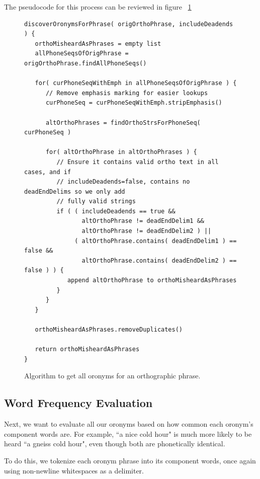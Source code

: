 The pseudocode for this process can be reviewed in figure ~\ref{fig:psuedoCode:discoverOronymsForPhrase}
\setlength\LTleft{-2in}
\begin{figure}
\begin{verbatim}
discoverOronymsForPhrase( origOrthoPhrase, includeDeadends ) {
   orthoMisheardAsPhrases = empty list
   allPhoneSeqsOfOrigPhrase = origOrthoPhrase.findAllPhoneSeqs()
   
   for( curPhoneSeqWithEmph in allPhoneSeqsOfOrigPhrase ) {
      // Remove emphasis marking for easier lookups
      curPhoneSeq = curPhoneSeqWithEmph.stripEmphasis()

      altOrthoPhrases = findOrthoStrsForPhoneSeq( curPhoneSeq )
      
      for( altOrthoPhrase in altOrthoPhrases ) {
         // Ensure it contains valid ortho text in all cases, and if
         // includeDeadends=false, contains no deadEndDelims so we only add
         // fully valid strings
         if ( ( includeDeadends == true &&
                altOrthoPhrase != deadEndDelim1 &&
                altOrthoPhrase != deadEndDelim2 ) ||
              ( altOrthoPhrase.contains( deadEndDelim1 ) == false &&
                altOrthoPhrase.contains( deadEndDelim2 ) == false ) ) {
            append altOrthoPhrase to orthoMisheardAsPhrases
         }
      }
   }
   
   orthoMisheardAsPhrases.removeDuplicates()

   return orthoMisheardAsPhrases
}
\end{verbatim}
\captionfonts
\caption[Pseudocode for discoverOronymsForPhrase]{ Algorithm to get all oronyms for an orthographic phrase. }
\label{fig:psuedoCode:discoverOronymsForPhrase}
\end{figure}
\setlength\LTleft{2in}




\subsection{Word Frequency Evaluation}
\label{subsection:wordFrequencyEvaluation}

Next, we want to evaluate all our oronyms based on how common each oronym's component words are.  For example, ``a nice cold hour" is much more likely to be heard ``a gneiss cold hour", even though both are phonetically identical.

To do this, we tokenize each oronym phrase into its component words, once again using non-newline whitespaces as a delimiter. 

